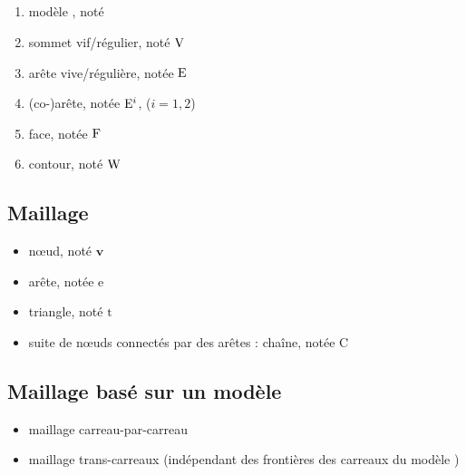 \subsection*{\brep}
\begin{enumerate}
	\item modèle \brep, noté \brepbody
	\item sommet vif/régulier, noté $\mathrm{V}$
	\item arête vive/régulière, notée $\mathrm{E}$
	\item (co-)arête, notée $\mathrm{E}^i$, ($i=1,2$)
	\item face, notée $\mathrm{F}$
	\item contour, noté $\mathrm{W}$
\end{enumerate}

\subsection*{Maillage}
\begin{itemize}
	\item n\oe ud, noté $\bm{v}$
	\item arête, notée $\mathrm{e}$
	\item triangle, noté $\mathrm{t}$
	\item suite de n\oe uds connectés par des arêtes : chaîne, notée $\mathrm{C}$ 
\end{itemize}

\subsection*{Maillage basé sur un modèle \brep}
\begin{itemize}
	\item maillage carreau-par-carreau
	\item maillage trans-carreaux (indépendant des frontières des carreaux du modèle \brep)
\end{itemize}
